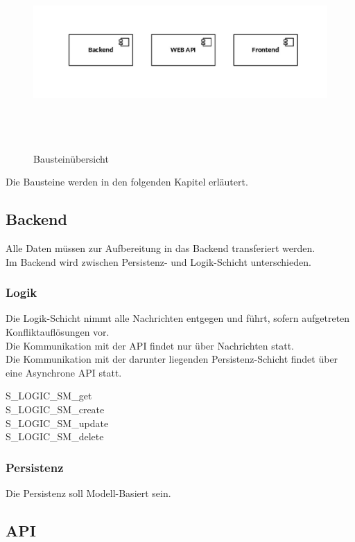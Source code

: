 \documentclass[oneside,11pt,parskip=half,ngerman]{scrreprt}
\makeatletter
\def\maxwidth{\ifdim\Gin@nat@width>\linewidth\linewidth
\else\Gin@nat@width\fi}
\let\Oldincludegraphics\includegraphics
\renewcommand{\includegraphics}[1]{\Oldincludegraphics[width=\maxwidth,height=20em,keepaspectratio]{#1}}
\makeatother
\begin{document}
\begin{figure}[htbp]
\centering
\includegraphics{img/design_components.jpg}
\caption{Bausteinübersicht\label{fig:bausteinübersicht}}
\end{figure}

Die Bausteine werden in den folgenden Kapitel erläutert.

\subsection{Backend}\label{backend}

Alle Daten müssen zur Aufbereitung in das Backend transferiert
werden.\\Im Backend wird zwischen Persistenz- und Logik-Schicht
unterschieden.

\subsubsection{Logik}\label{logik}

Die Logik-Schicht nimmt alle Nachrichten entgegen und führt, sofern
aufgetreten Konfliktauflösungen vor.\\Die Kommunikation mit der API
findet nur über Nachrichten statt.\\Die Kommunikation mit der darunter
liegenden Persistenz-Schicht findet über eine Asynchrone API statt.

S\_LOGIC\_SM\_get\\S\_LOGIC\_SM\_create\\S\_LOGIC\_SM\_update\\S\_LOGIC\_SM\_delete

\subsubsection{Persistenz}\label{persistenz}

Die Persistenz soll Modell-Basiert sein.

\subsection{API}\label{api}
\end{document}
